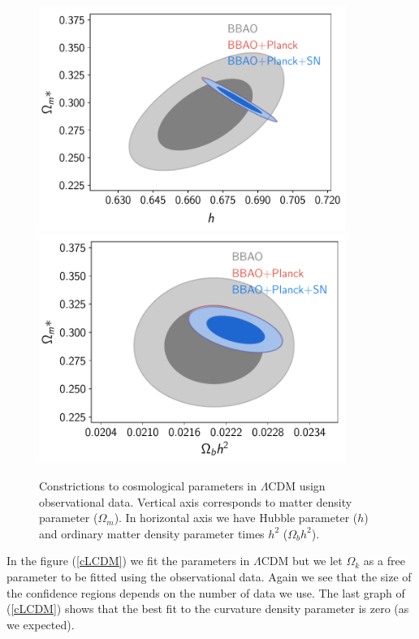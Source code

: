 \documentclass[onecolumn,           %
               showpacs,            %
               preprintnumbers,     %
               aps,                 %
               prl,          	    %
               letterpaper,             %
               superscriptaddress,      %
               nofootinbib,         %
               tightenlines,        %
               floats,floatfix      %
               ,usenatbib,
               ]{revtex4-1}
\begin{document}
\begin{figure}[h]
	\centering
	\includegraphics[width=10cm]{FiguresCosmo/h_Om_LCDM_todas.pdf}	
	\includegraphics[width=10cm]{FiguresCosmo/Obh2_Om_LCDM_todas.pdf}
	\caption{Constrictions to cosmological parameters in $\Lambda$CDM usign observational data. Vertical axis corresponds to matter density parameter ($\Omega_m$). In horizontal axis we have Hubble parameter ($h$) and ordinary matter density parameter times $h^2$ ($\Omega_b h^2$).}
	\label{LCDM}
\end{figure}

In the figure (\ref{cLCDM}) we fit the parameters in $\Lambda$CDM but we let $\Omega_k$ as a free parameter to be fitted using the observational data. Again we see that the size of the confidence regions depends on the number of data we use. The last graph of (\ref{cLCDM}) shows that the best fit to the curvature density parameter is zero (as we expected).
\end{document}
